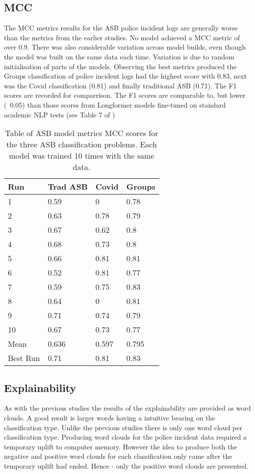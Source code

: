 \subsection{MCC} The MCC metrics results for the ASB police incident logs are generally worse than the metrics from the earlier studies. No model achieved a MCC metric of over 0.9. There was also considerable variation across model builds, even though the model was built on the same data each time. Variation is due to random initialisation of parts of the models. Observing the best metrics produced the Groups classification of police incident logs had the highest score with 0.83, next was the Covid classification (0.81) and finally traditional ASB (0.71). The F1 scores are recorded for comparrison. The F1 scores are comparable to, but lower (~0.05) than those scores from Longformer models fine-tuned on standard academic NLP tests (see Table 7 of \textcite{beltagy2020longformer}) 

\begin{table}[h]
\centering
\begin{tabular}{@{}llll@{}}
\toprule
Run      & Trad ASB & Covid & Groups \\ \midrule
1        & 0.59     & 0     & 0.78   \\
2        & 0.63     & 0.78  & 0.79   \\
3        & 0.67     & 0.62  & 0.8    \\
4        & 0.68     & 0.73  & 0.8    \\
5        & 0.66     & 0.81  & 0.81   \\
6        & 0.52     & 0.81  & 0.77   \\
7        & 0.59     & 0.75  & 0.83   \\
8        & 0.64     & 0     & 0.81   \\
9        & 0.71     & 0.74  & 0.79   \\
10       & 0.67     & 0.73  & 0.77   \\
Mean     & 0.636    & 0.597 & 0.795  \\
Best Run & 0.71     & 0.81  & 0.83   \\ \bottomrule
\end{tabular}
    \caption{{Table of ASB model metrics} MCC scores for the three ASB classification problems. Each model was trained 10 times with the same data.}
    \label{tab: asb_metrics}
\end{table}

\subsection{Explainability} As with the previous studies the results of the explainability are provided as word clouds. A good result is larger words having a intuitive bearing on the classification type. Unlike the previous studies there is only one word cloud per classification type. Producing word clouds for the police incident data required a temporary uplift to computer memory. However the idea to  produce both the negative and positive word clouds for each classification only came after the temporary uplift had ended. Hence - only the positive word clouds are presented. 

